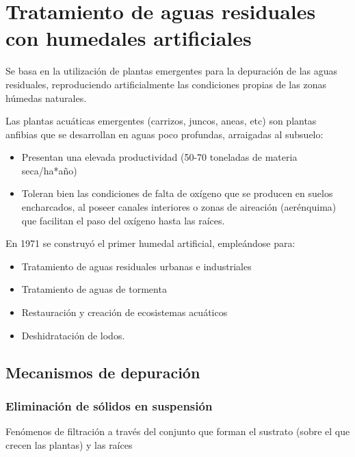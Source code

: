 \section{Tratamiento de aguas residuales con humedales artificiales}

Se basa en la utilización de plantas emergentes para la depuración de las aguas residuales, reproduciendo artificialmente las condiciones propias de las zonas húmedas naturales.

Las plantas acuáticas emergentes (carrizos, juncos, aneas, etc) son plantas anfibias que se desarrollan en aguas poco profundas, arraigadas al subsuelo:
\begin{itemize}
    \item Presentan una elevada productividad (50-70 toneladas de materia seca/ha*año)
    \item Toleran bien las condiciones de falta de oxígeno que se producen en suelos encharcados, al poseer canales interiores o zonas de aireación (aerénquima) que facilitan el paso del oxígeno hasta las raíces.
\end{itemize}
En 1971 se construyó el primer humedal artificial, empleándose para:
\begin{itemize}
    \item Tratamiento de aguas residuales urbanas e industriales
    \item Tratamiento de aguas de tormenta
    \item Restauración y creación de ecosistemas acuáticos
    \item Deshidratación de lodos.
\end{itemize}
\subsection{Mecanismos de depuración}
\subsubsection{Eliminación de sólidos en suspensión}
Fenómenos de filtración a través del conjunto que forman el sustrato (sobre el que crecen las plantas) y las raíces
